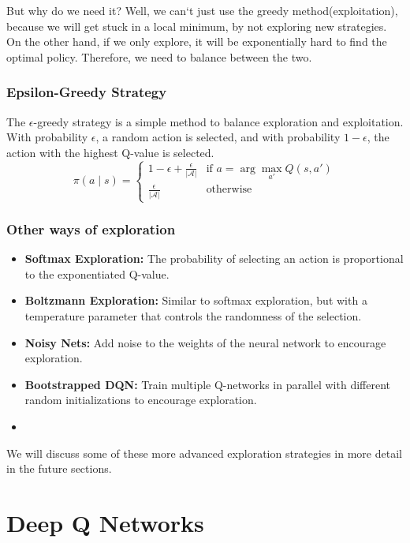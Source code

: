 \documentclass[a4paper,12pt]{article}
\begin{document}
But why do we need it? Well, we can`t just use the greedy method(exploitation), because we will get stuck in a local minimum, by not exploring new strategies. On the other hand, if we only explore, it will be exponentially hard to find the optimal policy. Therefore, we need to balance between the two.
\subsubsection{Epsilon-Greedy Strategy}
The $\epsilon$-greedy strategy is a simple method to balance exploration and exploitation. With probability $\epsilon$, a random action is selected, and with probability $1 - \epsilon$, the action with the highest Q-value is selected.
\[
\pi(a \mid s) = \begin{cases}
1 - \epsilon + \frac{\epsilon}{|\mathcal{A}|} & \text{if } a = \arg\max_{a'} Q(s, a') \\
\frac{\epsilon}{|\mathcal{A}|} & \text{otherwise}
\end{cases}
\]
\subsubsection{Other ways of exploration}
\begin{itemize}
    \item \textbf{Softmax Exploration:} The probability of selecting an action is proportional to the exponentiated Q-value.
    \item \textbf{Boltzmann Exploration:} Similar to softmax exploration, but with a temperature parameter that controls the randomness of the selection.
    \item \textbf{Noisy Nets:} Add noise to the weights of the neural network to encourage exploration.
    \item \textbf{Bootstrapped DQN:} Train multiple Q-networks in parallel with different random initializations to encourage exploration.    
    \item 
\end{itemize}
We will discuss some of these more advanced exploration strategies in more detail in the future sections.
\section{Deep Q Networks}
\end{document}
